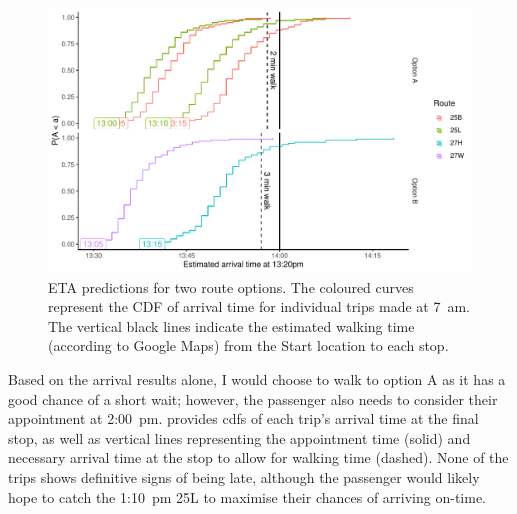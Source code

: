 \begin{knitrout}\small
{}\color{fgcolor}\begin{figure}

{\centering \includegraphics[width=\textwidth]{figure/eta_journey_arriveby-1} 

}

\caption[ETA predictions for two route options]{ETA predictions for two route options. The coloured curves represent the CDF of arrival time for individual trips made at 7~am. The vertical black lines indicate the estimated walking time (according to Google Maps) from the Start location to each stop.}\label{fig:eta_journey_arriveby}
\end{figure}


\end{knitrout}

Based on the arrival results alone, I would choose to walk to option A as it has a good chance of a short wait; however, the passenger also needs to consider their appointment at  2:00~pm.  provides \glspl{cdf} of each trip's arrival time at the final stop, as well as vertical lines representing the appointment time (solid) and necessary arrival time at the stop to allow for walking time (dashed). None of the trips shows definitive signs of being late, although the passenger would likely hope to catch the 1:10~pm 25L to maximise their chances of arriving on-time.


